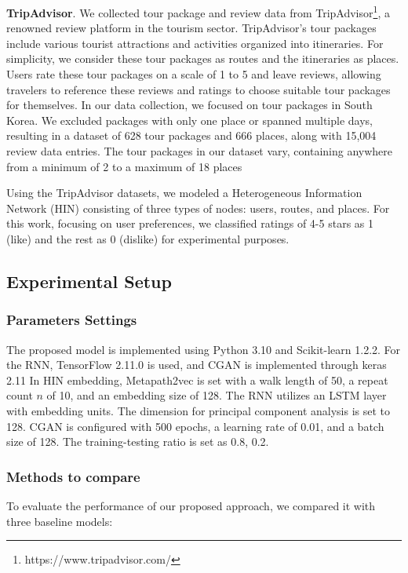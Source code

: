 \documentclass[]{article}
\begin{document}
\textbf{TripAdvisor}. We collected tour package and review data from TripAdvisor\footnote{https://www.tripadvisor.com/}, a renowned review platform in the tourism sector. TripAdvisor's tour packages include various tourist attractions and activities organized into itineraries. For simplicity, we consider these tour packages as routes and the itineraries as places. Users rate these tour packages on a scale of 1 to 5 and leave reviews, allowing travelers to reference these reviews and ratings to choose suitable tour packages for themselves. In our data collection, we focused on tour packages in South Korea. We excluded packages with only one place or spanned multiple days, resulting in a dataset of 628 tour packages and 666 places, along with 15,004 review data entries. The tour packages in our dataset vary, containing anywhere from a minimum of 2 to a maximum of 18 places

Using the TripAdvisor datasets, we modeled a Heterogeneous Information Network (HIN) consisting of three types of nodes: users, routes, and places. For this work, focusing on user preferences, we classified ratings of 4-5 stars as 1 (like) and the rest as 0 (dislike) for experimental purposes. 


\subsection{Experimental Setup}

\subsubsection*{Parameters Settings}
The proposed model is implemented using Python 3.10 and Scikit-learn 1.2.2. For the RNN, TensorFlow 2.11.0 is used, and CGAN is implemented through keras 2.11 In HIN embedding, Metapath2vec is set with a walk length of 50, a repeat count \(n\) of 10, and an embedding size of 128. The RNN utilizes an LSTM layer with embedding units. The dimension for principal component analysis is set to 128. CGAN is configured with 500 epochs, a learning rate of 0.01, and a batch size of 128. The training-testing ratio is set as 0.8, 0.2.

\subsubsection*{Methods to compare}
To evaluate the performance of our proposed approach, we compared it with three baseline models:\\
\end{document}
